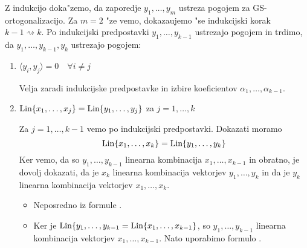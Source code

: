 Z indukcijo doka"zemo, da zaporedje $y_1, \ldots, y_m$ ustreza pogojem za GS-ortogonalizacijo. Za $m=2$ "ze vemo, dokazaujemo "se indukcijski korak $k-1 \rightsquigarrow k$. Po indukcijski predpostavki $y_1, \ldots, y_{k-1}$ ustrezajo pogojem in trdimo, da $y_1, \ldots, y_{k-1}, y_k$ ustrezajo pogojem:
\begin{enumerate}
    \item $\langle y_i, y_j \rangle = 0 \quad \forall i \neq j$
    
    Velja zaradi indukcijske predpostavke in izbire koeficientov $\alpha_1, \ldots, \alpha_{k-1}$.
    
    \item $\text{Lin} \{ x_1, \ldots, x_j \} = \text{Lin} \{y_1, \ldots, y_j \}$ za $j = 1, \ldots, k$
    
    Za $j = 1, \ldots, k-1$ vemo po indukcijski predpostavki. Dokazati moramo
    \begin{equation*}
    \text{Lin} \{ x_1, \ldots, x_k \} = \text{Lin} \{ y_1, \ldots, y_k \}
    \end{equation*}
    Ker vemo, da so $y_1, \ldots, y_{k-1}$ linearna kombinacija $x_1, \ldots, x_{k-1}$ in obratno, je dovolj dokazati, da je $x_k$ linearna kombinacija vektorjev $y_1, \ldots, y_k$ in da je $y_k$ linearna kombinacija vektorjev $x_1, \ldots, x_k$.
    \begin{itemize}
        \item {}
        
        Neposredno iz formule .
        
        \item {}
        
        Ker je $\text{Lin} \{ y_1, \ldots, y_{k-1} = \text{Lin} \{ x_1, \ldots, x_{k-1} \}$, so $y_1, \ldots, y_{k-1}$ linearna kombinacija vektorjev $x_1, \ldots, x_{k-1}$. Nato uporabimo formulo .
    \end{itemize}
\end{enumerate}


